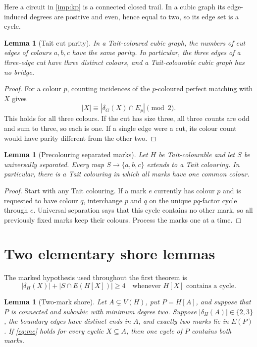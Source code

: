 \documentclass[11pt]{article}
\newtheorem{lemma}[theorem]{Lemma}
\theoremstyle{definition}
\theoremstyle{remark}
\begin{document}
Here a circuit in \ref{imp:kp} is a connected closed trail.  In a cubic
graph its edge-induced degrees are positive and even, hence equal to
two, so its edge set is a cycle.

\begin{lemma}[Tait cut parity]\label{lem:parity}
In a Tait-coloured cubic graph, the numbers of cut edges of colours
\(a,b,c\) have the same parity.  In particular, the three edges of a
three-edge cut have three distinct colours, and a Tait-colourable cubic
graph has no bridge.
\end{lemma}

\begin{proof}
For a colour \(p\), counting incidences of the \(p\)-coloured perfect
matching with \(X\) gives
\[
  |X|\equiv |\delta_G(X)\cap E_p|\pmod 2.
\]
This holds for all three colours.  If the cut has size three, all three
counts are odd and sum to three, so each is one.  If a single edge were
a cut, its colour count would have parity different from the other two.
\end{proof}

\begin{lemma}[Precolouring separated marks]\label{lem:precolour}
Let \(H\) be Tait-colourable and let \(S\) be universally separated.
Every map \(S\to\{a,b,c\}\) extends to a Tait colouring.  In particular,
there is a Tait colouring in which all marks have one common colour.
\end{lemma}

\begin{proof}
Start with any Tait colouring.  If a mark \(e\) currently has colour
\(p\) and is requested to have colour \(q\), interchange \(p\) and
\(q\) on the unique \(pq\)-factor cycle through \(e\).  Universal
separation says that this cycle contains no other mark, so all previously
fixed marks keep their colours.  Process the marks one at a time.
\end{proof}

\section{Two elementary shore lemmas}

The marked hypothesis used throughout the first theorem is
\begin{equation}
 |\delta_H(X)|+|S\cap E(H[X])|\geq4
 \quad\text{whenever \(H[X]\) contains a cycle.}
 \tag{MC}\label{eq:mc}
\end{equation}

\begin{lemma}[Two-mark shore]\label{lem:two-shore}
Let \(A\subsetneq V(H)\), put \(P=H[A]\), and suppose that \(P\) is
connected and subcubic with minimum degree two.  Suppose
\(|\delta_H(A)|\in\{2,3\}\), the boundary edges have distinct ends in
\(A\), and exactly two marks lie in \(E(P)\).  If
\eqref{eq:mc} holds for every cyclic \(X\subseteq A\), then one cycle of
\(P\) contains both marks.
\end{lemma}
\end{document}
